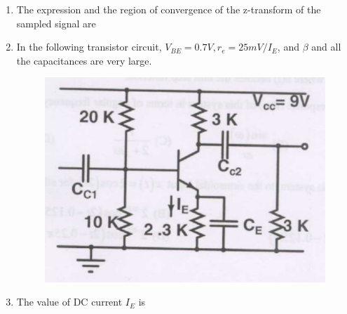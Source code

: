 \documentclass[a4paper, 11pt]{article}
\begin{document}
\begin{enumerate}
    \hfill{}
    
    \item The expression and the region of convergence of the z-transform of the sampled signal are
    \begin{enumerate}
    \end{enumerate}

    \hfill{}
    
    \item[] In the following transistor circuit, $V_{BE} = 0.7V, r_e = 25mV/I_E$, and $\beta$ and all the capacitances are very large.
    \begin{figure}[H]
        \centering
        \includegraphics[width=0.6\columnwidth]{q80}
        \caption*{}
        \label{fig:q80}
    \end{figure}
    
    \item The value of DC current $I_E$ is
    \begin{enumerate}
    \end{enumerate}


\end{enumerate}
\end{document}
